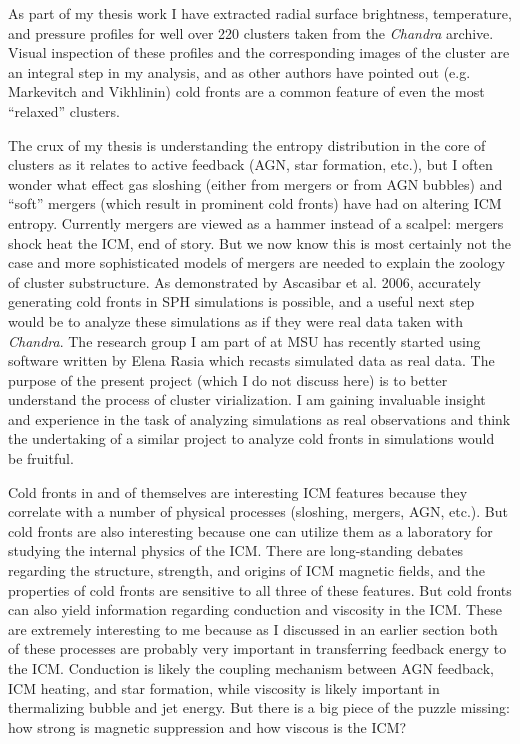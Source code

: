 \documentclass[11pt]{article}
\begin{document}
As part of my thesis work I have extracted radial surface brightness,
temperature, and pressure profiles for well over 220 clusters taken from
the {\it Chandra} archive. Visual inspection of these profiles and
the corresponding images of the cluster are an integral step in my
analysis, and as other authors have pointed out (e.g. Markevitch and
Vikhlinin) cold fronts are a common feature of even the most
``relaxed'' clusters.

The crux of my thesis is understanding the
entropy distribution in the core of clusters as it relates to active
feedback (AGN, star formation, etc.), but I often wonder what effect
gas sloshing (either from mergers or from AGN bubbles) and ``soft''
mergers (which result in prominent cold fronts) have had on altering ICM
entropy. Currently mergers are viewed as a hammer instead of a scalpel:
mergers shock heat the ICM, end of story. But we now know this is most
certainly not the case and more sophisticated models of mergers are
needed to explain the zoology of cluster substructure. As demonstrated
by Ascasibar et al. 2006, accurately generating cold fronts in SPH
simulations is possible, and a useful next step would be to analyze
these simulations as if they were real data taken with {\it
Chandra}. The research group I am part of at MSU has recently started
using software written by Elena Rasia which recasts simulated data as
real data. The purpose of the present project (which I do not discuss
here) is to better understand the process of cluster virialization. I
am gaining invaluable insight and experience in the task of analyzing
simulations as real observations and think the undertaking of a
similar project to analyze cold fronts in simulations would be
fruitful.

Cold fronts in and of themselves are interesting ICM features because
they correlate with a number of physical processes (sloshing, mergers,
AGN, etc.). But cold fronts are also interesting because one can
utilize them as a laboratory for studying the internal physics of the
ICM. There are long-standing debates regarding the structure,
strength, and origins of ICM magnetic fields, and the properties of
cold fronts are sensitive to all three of these features. But cold
fronts can also yield information regarding conduction and
viscosity in the ICM. These are extremely interesting to me because as
I discussed in an earlier section both of these processes are
probably very important in transferring feedback energy to the
ICM. Conduction is likely the coupling mechanism between AGN feedback,
ICM heating, and star formation, while viscosity is likely important
in thermalizing bubble and jet energy. But there is a big piece of the
puzzle missing: how strong is magnetic suppression and how viscous is
the ICM?
\end{document}

